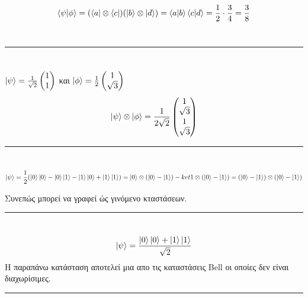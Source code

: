 \documentclass[12pt]{article}
\begin{document}
\section*{{}}
$$\braket{\psi|\phi} = (\bra{a}\otimes\bra{c})(\ket{b}\otimes\ket{d}) = \braket{a|b}\braket{c|d}=\frac{1}{2}\cdot\frac{3}{4}=\frac{3}{8} $$
 \\ \rule{\textwidth}{.5pt}
\section*{{}}
{\centering
$ \ket{\psi} = \frac{1}{\sqrt{2}}\begin{pmatrix} 1\\ 1\end{pmatrix}$ και $ \ket{\phi} = \frac{1}{2}\begin{pmatrix} 1\\ \sqrt{3}\end{pmatrix}$
$$\ket{\psi}\otimes\ket{\phi} = \frac{1}{2\sqrt{2}}\begin{pmatrix}1\\\sqrt{3}\\1\\\sqrt{3}\end{pmatrix} $$
}
\rule{\textwidth}{.5pt}
\section*{{}}
$$\ket{\psi} = \frac{1}{2}(\ket{0}\ket{0} - \ket{0}\ket{1} - \ket{1}\ket{0} + \ket{1}\ket{1})  = \ket{0}\otimes(\ket{0}-\ket{1})-ket{1}\otimes(\ket{0}-\ket{1}) =(\ket{0} - \ket{1})\otimes(\ket{0} - \ket{1})  $$

Συνεπώς μπορεί να γραφεί ώς γινόμενο κταστάσεων.\\
\rule{\textwidth}{.5pt}
\section*{{}}

$$\ket{\psi} = \frac{\ket{0}\ket{0} + \ket{1}\ket{1}}{\sqrt{2}} $$
Η παραπάνω κατάσταση αποτελεί μια απο τις καταστάσεις \textlatin{Bell} οι οποίες δεν είναι διαχωρίσιμες.
\rule{\textwidth}{.5pt}
\end{document}
